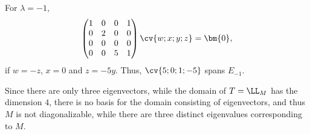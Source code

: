 \documentclass[11pt]{scrartcl}
\begin{document}
\begin{linenumbers}
\begin{soln}
  For $\lambda = -1$,
  \begin{align}
    \begin{pmatrix}
      1 & 0 & 0 & 1 \\
      0 & 2 & 0 & 0 \\
      0 & 0 & 0 & 0 \\
      0 & 0 & 5 & 1
    \end{pmatrix}\cv{w;x;y;z} = \bm{0},
  \end{align}
  if $w = -z$, $x=0$ and $z = -5y$. Thus, $\cv{5;0;1;-5}$ spans $E_{-1}$.

  Since there are only three eigenvectors, while the domain of
  $T = \LL_{M}$ has the dimension $4$, there is no basis for the
  domain consisting of eigenvectors, and thus $M$ is not
  diagonalizable, while there are three distinct eigenvalues
  corresponding to $M$.
  \end{soln}

\end{linenumbers}
\end{document}
